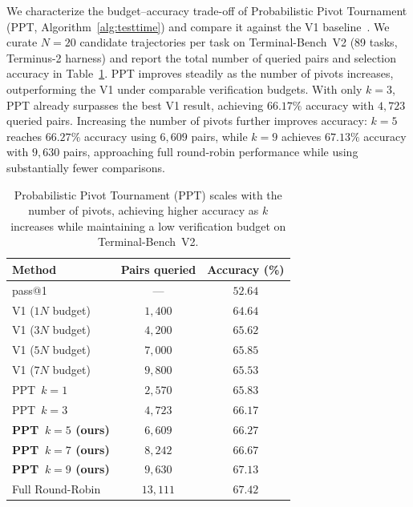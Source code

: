 We characterize the budget--accuracy trade-off of Probabilistic Pivot Tournament (PPT, Algorithm~\ref{alg:testtime}) and compare it against the V1 baseline~\citet{singh_v_1_2026}. We curate $N=20$ candidate trajectories per task on Terminal-Bench~V2 (89 tasks, Terminus-2 harness) and report the total number of queried pairs and selection accuracy in Table~\ref{tab:pivot-budget}. PPT improves steadily as the number of pivots increases, outperforming the V1 under comparable verification budgets. With only $k{=}3$, PPT already surpasses the best V1 result, achieving $66.17\%$ accuracy with $4{,}723$ queried pairs. Increasing the number of pivots further improves accuracy: $k{=}5$ reaches $66.27\%$ accuracy using $6{,}609$ pairs, while $k{=}9$ achieves $67.13\%$ accuracy with $9{,}630$ pairs, approaching full round-robin performance while using substantially fewer comparisons.

\clearpage

\begin{table}[h]
    \centering
    \caption{Probabilistic Pivot Tournament (PPT) scales with the number of pivots, achieving higher accuracy as $k$ increases while maintaining a low verification budget on Terminal-Bench~V2.}
    \label{tab:pivot-budget}
    \small
\begin{tabular}{lcc}
  \toprule
  Method & Pairs queried & Accuracy (\%) \\
  \midrule
  pass@1   & --- & $52.64$ \\
  \midrule
  V1 ($1N$ budget) \citep{singh_v_1_2026}   & $1{,}400$ & $64.64$ \\
  V1 ($3N$ budget) \citep{singh_v_1_2026}   & $4{,}200$ & $65.62$ \\
  V1 ($5N$ budget) \citep{singh_v_1_2026}   & $7{,}000$ & $65.85$ \\
  V1 ($7N$ budget) \citep{singh_v_1_2026}   & $9{,}800$ & $65.53$ \\
\midrule
    PPT \,$k{=}1$        & $2{,}570$ & $65.83$ \\
    PPT \,$k{=}3$        & $4{,}723$ & $66.17$ \\
    \textbf{PPT \,$k{=}5$ (ours)}   & $6{,}609$ & $\mathbf{66.27}$ \\
    \textbf{PPT \,$k{=}7$ (ours)}   & $8{,}242$ & $\mathbf{66.67}$ \\
    \textbf{PPT \,$k{=}9$ (ours)}   & $9{,}630$ & $\mathbf{67.13}$ \\                                           
    \midrule
  Full Round-Robin & $13{,}111$ & $67.42$ \\
  \bottomrule
  \end{tabular}
\end{table}

